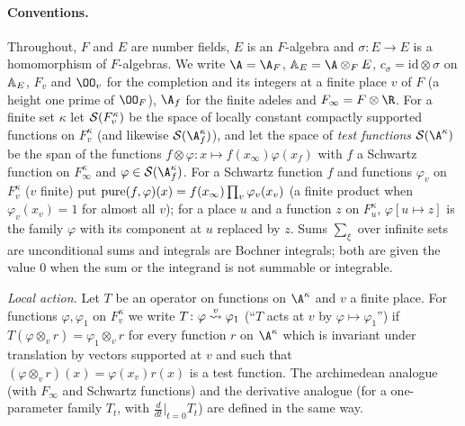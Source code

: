 \paragraph{Conventions.}
Throughout, $F$ and $E$ are number fields, $E$ is an $F$-algebra and $\sigma\colon E\to E$ is a homomorphism of
$F$-algebras. We write $\A=\A_F$, $\thmKAE=\A\otimes_FE$, $c_\sigma=\mathrm{id}\otimes\sigma$ on $\mathbb{A}_E$, $F_v$ and
$\OO_v$ for the completion and its integers at a finite place $v$ of $F$ (a height one prime of $\OO_F$), $\A_f$ for the
finite adeles and $F_\infty=F\otimes\R$. For a finite set $\kappa$ let $\mathcal{S}(F_v^\kappa)$ be the space of locally
constant compactly supported functions on $F_v^\kappa$ (and likewise $\thmKS(\A_f^\kappa)$), and let the space of
\emph{test functions} $\thmKS(\A^\kappa)$ be the span of the functions $f\otimes\varphi\colon x\mapsto
f(x_\infty)\varphi(x_f)$ with $f$ a Schwartz function on $F_\infty^\kappa$ and $\varphi\in\thmKS(\A_f^\kappa)$. For a
Schwartz function $f$ and functions $\varphi_v$ on $F_v^\kappa$ ($v$ finite) put
$\operatorname{pure}(f,\varphi)(x)=f(x_\infty)\prod_v\varphi_v(x_v)$ (a finite product when $\varphi_v(x_v)=1$ for almost all
$v$); for a place $u$ and a function $z$ on $F_u^\kappa$, $\varphi[u\mapsto z]$ is the family $\varphi$ with its
component at $u$ replaced by $z$. Sums $\sum_{\xi}$ over infinite sets are unconditional sums and integrals are Bochner
integrals; both are given the value $0$ when the sum or the integrand is not summable or integrable.

\emph{Local action.} Let $T$ be an operator on functions on $\A^\kappa$ and $v$ a finite place. For functions
$\varphi,\varphi_1$ on $F_v^\kappa$ we write $T\colon\varphi\mathrel{\stackrel{v}{\leadsto}}\varphi_1$ (``$T$ acts at $v$ by
$\varphi\mapsto\varphi_1$'') if $T(\varphi\otimes_v r)=\varphi_1\otimes_v r$ for every function $r$ on $\A^\kappa$
which is invariant under translation by vectors supported at $v$ and such that
$(\varphi\otimes_v r)(x)=\varphi(x_v)r(x)$ is a test function. The archimedean analogue (with $F_\infty$ and Schwartz
functions) and the derivative analogue (for a one-parameter family $T_t$, with $\frac{d}{dt}|_{t=0}T_t$) are defined in
the same way.

